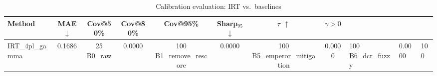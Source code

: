\begin{table}[t]
\centering
\small
\caption{Calibration evaluation: IRT vs.\ baselines}
\label{tab:calibration-eval}
\begin{tabular}{lccccccc}
\toprule
Method & MAE $\downarrow$ & Cov@50\% & Cov@80\% & Cov@95\% & Sharp$_{95}$ $\downarrow$ & $\tau$ $\uparrow$ & $\gamma > 0$ \\
\midrule
IRT\_4pl\_gamma & 0.1686 & 25%
B0\_raw & 0.0000 & 100%
B1\_remove\_rescore & 0.0000 & 100%
B5\_emperor\_mitigation & 0.0000 & 100%
B6\_dcr\_fuzzy & 0.0000 & 100%
\bottomrule
\end{tabular}
\end{table}